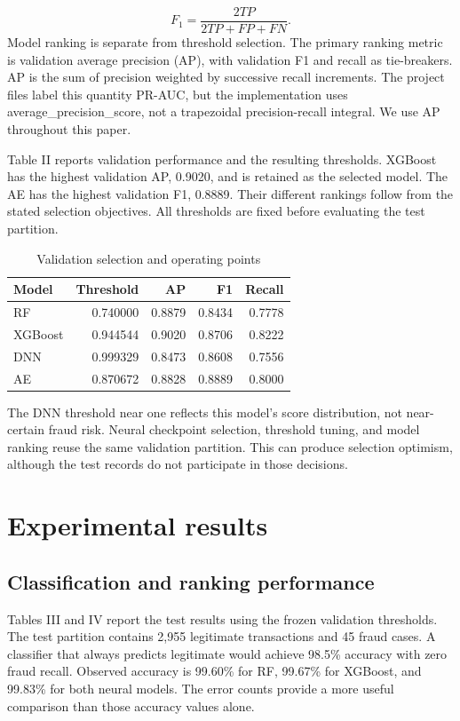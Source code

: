 \documentclass[conference]{IEEEtran}
\begin{document}
\begin{equation}
F_1=\frac{2TP}{2TP+FP+FN}.
\end{equation}
Model ranking is separate from threshold selection. The primary ranking metric is validation average precision (AP), with validation F1 and recall as tie-breakers. AP is the sum of precision weighted by successive recall increments. The project files label this quantity PR-AUC, but the implementation uses average\_precision\_score, not a trapezoidal precision-recall integral. We use AP throughout this paper.

Table II reports validation performance and the resulting thresholds. XGBoost has the highest validation AP, 0.9020, and is retained as the selected model. The AE has the highest validation F1, 0.8889. Their different rankings follow from the stated selection objectives. All thresholds are fixed before evaluating the test partition.

\begin{table}[t]
\caption{Validation selection and operating points}
\centering\footnotesize
\setlength{\tabcolsep}{3pt}
\begin{tabular}{lrrrr}
\toprule
Model & Threshold & AP & F1 & Recall\\
\midrule
RF & 0.740000 & 0.8879 & 0.8434 & 0.7778\\
XGBoost & 0.944544 & 0.9020 & 0.8706 & 0.8222\\
DNN & 0.999329 & 0.8473 & 0.8608 & 0.7556\\
AE & 0.870672 & 0.8828 & 0.8889 & 0.8000\\
\bottomrule
\end{tabular}
\end{table}
The DNN threshold near one reflects this model's score distribution, not near-certain fraud risk. Neural checkpoint selection, threshold tuning, and model ranking reuse the same validation partition. This can produce selection optimism, although the test records do not participate in those decisions.

\section{Experimental results}
\subsection{Classification and ranking performance}
Tables III and IV report the test results using the frozen validation thresholds. The test partition contains 2,955 legitimate transactions and 45 fraud cases. A classifier that always predicts legitimate would achieve 98.5\% accuracy with zero fraud recall. Observed accuracy is 99.60\% for RF, 99.67\% for XGBoost, and 99.83\% for both neural models. The error counts provide a more useful comparison than those accuracy values alone.
\end{document}
